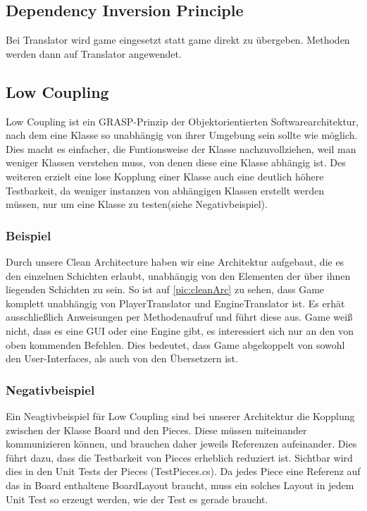 \documentclass[
10pt, %
a4paper, %
oneside, %
headinclude,footinclude, %
BCOR5mm, %
]{scrartcl}
\begin{document}
\begin{onehalfspace}
\subsection{Dependency Inversion Principle}
Bei Translator wird game eingesetzt statt game direkt zu übergeben. Methoden werden dann auf Translator angewendet.
\subsection{Low Coupling}
Low Coupling ist ein GRASP-Prinzip der Objektorientierten Softwarearchitektur, nach dem eine Klasse so unabhängig von ihrer Umgebung sein sollte wie möglich. Dies macht es einfacher, die Funtionsweise der Klasse nachzuvollziehen, weil man weniger Klassen verstehen muss, von denen diese eine Klasse abhängig ist. Des weiteren erzielt eine lose Kopplung einer Klasse auch eine deutlich höhere Testbarkeit, da weniger instanzen von abhängigen Klassen erstellt werden müssen, nur um eine Klasse zu testen(siehe Negativbeispiel).

\subsubsection{Beispiel}
Durch unsere Clean Architecture haben wir eine Architektur aufgebaut, die es den einzelnen Schichten erlaubt, unabhängig von den Elementen der über ihnen liegenden Schichten zu sein. So ist auf \autoref{pic:cleanArc} zu sehen, dass Game komplett unabhängig von PlayerTranslator und EngineTranslator ist. Es erhät ausschließlich Anweisungen per Methodenaufruf und führt diese aus. Game weiß nicht, dass es eine GUI oder eine Engine gibt, es interessiert sich nur an den von oben kommenden Befehlen. Dies bedeutet, dass Game abgekoppelt von sowohl den User-Interfaces, als auch von den Übersetzern ist.

\subsubsection{Negativbeispiel}
Ein Neagtivbeispiel für Low Coupling sind bei unserer Architektur die Kopplung zwischen der Klasse Board und den Pieces. Diese müssen miteinander kommunizieren können, und brauchen daher jeweils Referenzen aufeinander. Dies führt dazu, dass die Testbarkeit von Pieces erheblich reduziert ist. Sichtbar wird dies in den Unit Tests der Pieces (TestPieces.cs). Da jedes Piece eine Referenz auf das in Board enthaltene BoardLayout braucht, muss ein solches Layout in jedem Unit Test so erzeugt werden, wie der Test es gerade braucht.


\end{onehalfspace}
\end{document}

